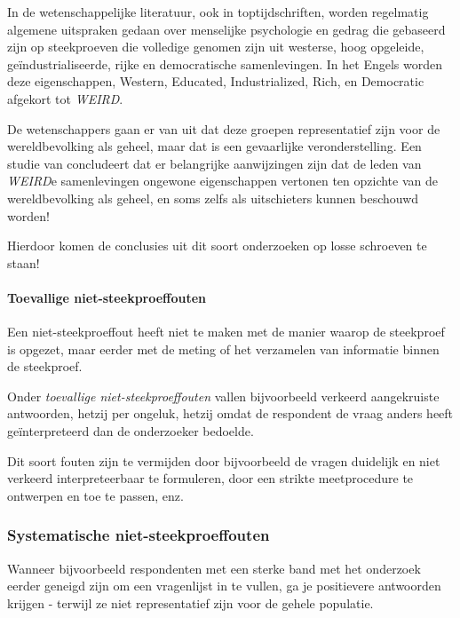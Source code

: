 \begin{example}
  In de wetenschappelijke literatuur, ook in toptijdschriften, worden regelmatig algemene uitspraken gedaan over menselijke psychologie en gedrag die gebaseerd zijn op steekproeven die volledige genomen zijn uit westerse, hoog opgeleide, geïndustrialiseerde, rijke en democratische samenlevingen. In het Engels worden deze eigenschappen, Western, Educated, Industrialized, Rich, en Democratic afgekort tot \emph{WEIRD}.
  
  De wetenschappers gaan er van uit dat deze groepen representatief zijn voor de wereldbevolking als geheel, maar dat is een gevaarlijke veronderstelling. Een studie van \textcite{HenrichEtAl2010} concludeert dat er belangrijke aanwijzingen zijn dat de leden van \emph{WEIRD}e samenlevingen ongewone eigenschappen vertonen ten opzichte van de wereldbevolking als geheel, en soms zelfs als uitschieters kunnen beschouwd worden!
  
  Hierdoor komen de conclusies uit dit soort onderzoeken op losse schroeven te staan!
\end{example}

\paragraph{Toevallige niet-steekproeffouten}

Een niet-steekproeffout heeft niet te maken met de manier waarop de steekproef is opgezet, maar eerder met de meting of het verzamelen van informatie binnen de steekproef.

Onder \emph{toevallige niet-steekproeffouten} vallen bijvoorbeeld verkeerd aangekruiste antwoorden, hetzij per ongeluk, hetzij omdat de respondent de vraag anders heeft geïnterpreteerd dan de onderzoeker bedoelde.

Dit soort fouten zijn te vermijden door bijvoorbeeld de vragen duidelijk en niet verkeerd interpreteerbaar te formuleren, door een strikte meetprocedure te ontwerpen en toe te passen, enz.

\subsubsection{Systematische niet-steekproeffouten}

Wanneer bijvoorbeeld respondenten met een sterke band met het onderzoek eerder geneigd zijn om een vragenlijst in te vullen, ga je positievere antwoorden krijgen - terwijl ze niet representatief zijn voor de gehele populatie.

